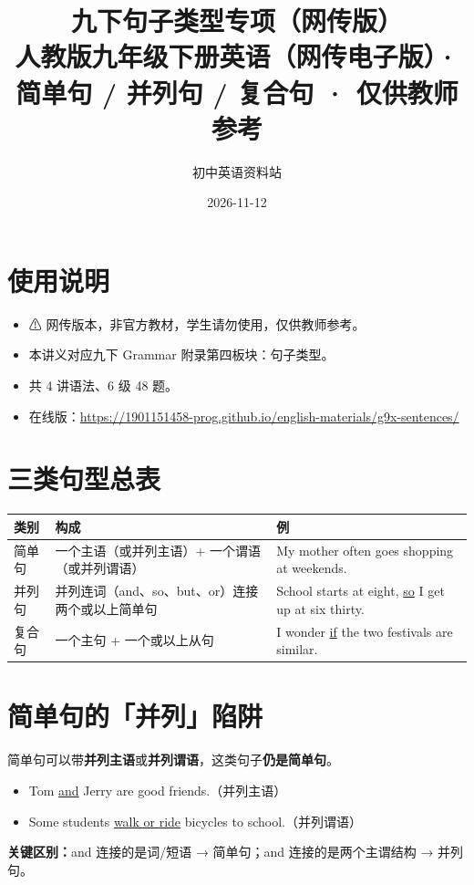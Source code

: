 \documentclass[11pt,a4paper]{ctexart}
\title{\textbf{九下句子类型专项（网传版）}\\[4pt]
\large 人教版九年级下册英语（网传电子版）· 简单句 / 并列句 / 复合句 · 仅供教师参考}
\author{初中英语资料站}
\date{2026-11-12}
\begin{document}
\maketitle

\section*{使用说明}
\begin{itemize}[leftmargin=1.4em]
\item ⚠ 网传版本，非官方教材，学生请勿使用，仅供教师参考。
\item 本讲义对应九下 Grammar 附录第四板块：句子类型。
\item 共 4 讲语法、6 级 48 题。
\item 在线版：\url{https://1901151458-prog.github.io/english-materials/g9x-sentences/}
\end{itemize}

\begin{center}
\end{center}
\bigskip
\section{三类句型总表}
\begin{center}
\begin{tabular}{p{2.6cm}p{6.4cm}p{4.0cm}}
\hline
\textbf{类别} & \textbf{构成} & \textbf{例}\\
\hline
简单句 & 一个主语（或并列主语）+ 一个谓语（或并列谓语） & My mother often goes shopping at weekends.\\
并列句 & 并列连词（and、so、but、or）连接两个或以上简单句 & School starts at eight, \underline{so} I get up at six thirty.\\
复合句 & 一个主句 + 一个或以上从句 & I wonder \underline{if} the two festivals are similar.\\
\hline
\end{tabular}
\end{center}

\section{简单句的「并列」陷阱}
简单句可以带\textbf{并列主语}或\textbf{并列谓语}，这类句子\textbf{仍是简单句}。
\begin{itemize}[leftmargin=1.4em]
\item Tom \underline{and} Jerry are good friends.（并列主语）
\item Some students \underline{walk or ride} bicycles to school.（并列谓语）
\end{itemize}
\textbf{关键区别：}and 连接的是词/短语 → 简单句；and 连接的是两个主谓结构 → 并列句。
\end{document}
